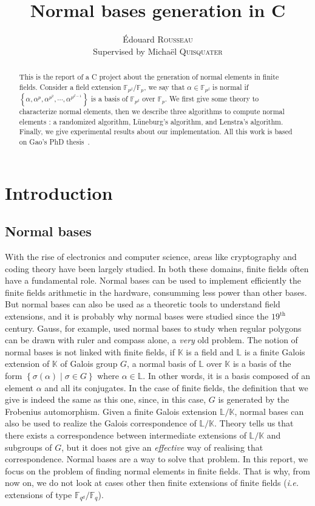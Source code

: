 \documentclass[a4paper,11pt]{article}
\title{Normal bases generation in C}
\author{Édouard \textsc{Rousseau}\\Supervised by Michaël \textsc{Quisquater}}
\theoremstyle{break}
\theoremstyle{sc}
\theoremstyle{definition}
\theoremstyle{remark}
\newcommand{\ie}{\emph{i.e. }}
\begin{document}
\maketitle

\begin{abstract}
  This is the report of a C project about the generation of normal elements in
  finite fields. Consider a field extension $\mathbb{F}_{p^d}/\mathbb{F}_p$, we
  say that $\alpha\in\mathbb{F}_{p^d}$ is normal if $\left\{
  \alpha,\alpha^p,\alpha^{p^2},\cdots,\alpha^{p^{d-1}} \right\}$ is a basis of
  $\mathbb{F}_{p^d}$ over $\mathbb{F}_p$. We first give some theory to
  characterize normal elements, then we describe three algorithms to compute
  normal elements : a randomized algorithm, Lüneburg's algorithm, and
  Lenstra's algorithm. Finally, we give experimental results about our
  implementation. All this work is based on Gao's PhD thesis~\cite{Ga93}.

\end{abstract}

\tableofcontents

\clearpage

\section{Introduction}
\subsection{Normal bases}
With the rise of electronics and computer science, areas like
cryptography and coding theory have been largely studied. In both these
domains, finite fields often have a fundamental role. Normal bases can be
used to implement efficiently the finite fields arithmetic in the hardware,
consumming less power than other bases. But normal bases can also be used as a
theoretic tools to understand field extensions, and it is probably why normal bases were
studied since the $19^\textrm{th}$ century. Gauss, for example, used normal
bases to study when regular polygons can be drawn with ruler and compass
alone, a \emph{very} old problem. The notion of normal bases is not linked
with finite fields, if $\mathbb{K}$ is a field and $\mathbb{L}$ is a finite
Galois extension of $\mathbb{K}$ of Galois group $G$, a normal basis of
$\mathbb{L}$ over $\mathbb{K}$ is a basis of the form $\left\{
  \sigma(\alpha)\;|\;\sigma\in G
\right\}$ where $\alpha\in\mathbb{L}$. In other words, it is a basis composed
of an element $\alpha$ and all its conjugates. In the case of finite fields,
the definition that we give is indeed the same as this one, since, in this case,
$G$ is generated by the Frobenius automorphism. Given a finite Galois extension
$\mathbb{L}/\mathbb{K}$, normal bases can also be used to realize the Galois
correspondence of $\mathbb{L}/\mathbb{K}$. Theory tells us that there exists a
correspondence between intermediate extensions of $\mathbb{L}/\mathbb{K}$ and subgroups
of $G$, but it does not give an \emph{effective} way of realising that
correspondence. Normal bases are a way to solve that problem. In this report, we
focus on the problem of finding normal elements in finite fields. That is
why, from now on, we do not look at cases other then finite extensions
of finite fields (\ie extensions of type
$\mathbb{F}_{q^d}/\mathbb{F}_q$).
\end{document}
